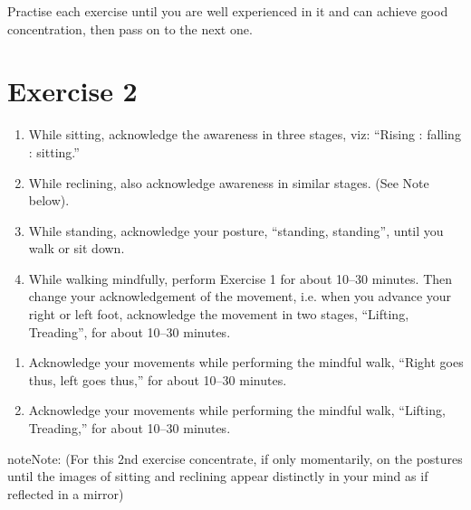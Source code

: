 \documentclass[a5paper,10pt,english]{book}
\begin{document}
\sphinxAtStartPar
Practise each exercise until you are well experienced in it and can achieve good concentration, then pass on to the next one.


\section{Exercise 2}
\label{\detokenize{practice:exercise-2}}\begin{enumerate}
%
\item {} 
\sphinxAtStartPar
While sitting, acknowledge the awareness in three stages, viz:\sphinxhyphen{} “Rising : falling : sitting.”

\item {} 
\sphinxAtStartPar
While reclining, also acknowledge awareness in similar stages. (See Note below).

\item {} 
\sphinxAtStartPar
While standing, acknowledge your posture, “standing, standing”, until you walk or sit down.

\item {} 
\sphinxAtStartPar
While walking mindfully, perform Exercise 1 for about 10–30 minutes. Then change your acknowledgement of the movement, i.e. when you advance your right or left foot, acknowledge the movement in two stages, “Lifting, Treading”, for about 10–30 minutes.

\end{enumerate}

\sphinxAtStartPar
{}
\begin{enumerate}
%
\item {} 
\sphinxAtStartPar
Acknowledge your movements while performing the mindful walk, “Right goes thus, left goes thus,” for about 10–30 minutes.

\item {} 
\sphinxAtStartPar
Acknowledge your movements while performing the mindful walk, “Lifting, Treading,” for about 10–30 minutes.

\end{enumerate}

\begin{sphinxadmonition}{note}{Note:}
\sphinxAtStartPar
(For this 2nd exercise concentrate, if only momentarily, on the postures until the images of sitting and reclining appear distinctly in your mind as if reflected in a mirror)
\end{sphinxadmonition}
\end{document}

